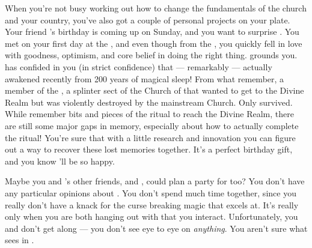 \documentclass[char]{GL2020}
\begin{document}
{When you're not busy working out how to change the fundamentals of the church and your country, you've also got a couple of personal projects on your plate. Your friend \cDisney{\full}'s birthday is coming up on Sunday, and you want to surprise \cDisney{\them}. You met \cDisney{} on your first day at the \pSc{}, and even though \cDisney{\they} \cDisney{\are} from the \pFarm{}, you quickly fell in love with \cDisney{\their} goodness, optimism, and core belief in doing the right thing. \cDisney{} grounds you. \cDisney{} has confided in you (in strict confidence) that — remarkably — \cDisney{\they} \cDisney{\were} actually awakened recently from 200 years of magical sleep! From what \cDisney{\they} remember\cDisney{\verbs}, \cDisney{\they} \cDisney{\are} a member of the \cDisneySect{}, a splinter sect of the Church of \cFarmGod{} that wanted to get to the Divine Realm but was violently destroyed by the mainstream Church. Only \cDisney{\they} survived. While \cDisney{\they} remember\cDisney{\verbs} bits and pieces of the ritual to reach the Divine Realm, there are still some major gaps in \cDisney{\their} memory, especially about how to actually complete the ritual! You're sure that with a little research and innovation you can figure out a way to recover these lost memories together. It's a perfect birthday gift, and you know \cDisney{\they}'ll be so happy.

Maybe you and \cDisney{}'s other friends, \cAdopted{\full} and \cPirateChild{\full}, could plan a party for \cDisney{\them} too? You don’t have any particular opinions about \cAdopted{}. You don’t spend much time together, since you really don’t have a knack for the curse breaking magic that \cAdopted{} excels at. It’s really only when you are both hanging out with \cDisney{} that you interact. Unfortunately, you and \cPirateChild{} don't get along — you don't see eye to eye on \emph{anything}. You aren't sure what \cDisney{} sees in \cPirateChild{\them}. }
\end{document}

